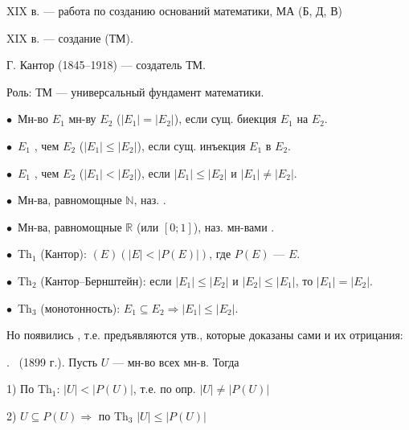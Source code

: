 
\makeatletter
\newcommand{\hov}[1]{\mathord{\begin{tikzpicture}[baseline=(hv.base)]\node[inner sep=0pt,outer sep=0pt](hv){$#1$};
  \pgfmathsetmacro{\hvA}{(rnd-0.5)*1.2}\pgfmathsetmacro{\hvB}{(rnd-0.5)*1.2}%
  \draw[line width=0.6pt,line cap=round] ($(hv.north west)+(-0.5pt,1.6pt+\hvA pt)$) -- ($(hv.north east)+(0.8pt,1.6pt+\hvB pt)$);\end{tikzpicture}}}
\newcommand{\rt}[1]{\surd\!\hov{#1}}
\makeatother
\newcommand{\bul}{\par\hangindent=6mm\hangafter=1\noindent$\bullet$\ }
\newcommand{\nm}[1]{\par\hangindent=7mm\hangafter=1\noindent #1\ }
\shapka
{}
\par
XIX в. --- работа по созданию оснований математики, МА (Б, Д, В)\par
XIX в. --- создание  (ТМ).\par
Г. Кантор (1845--1918) --- создатель ТМ.\par
Роль: ТМ --- универсальный фундамент математики.\par\vspace{1mm}
\bul Мн-во $E_1$  мн-ву $E_2$ ($|E_1|=|E_2|$), если сущ. биекция $E_1$ на $E_2$.
\bul $E_1$ , чем $E_2$ ($|E_1|\le|E_2|$), если сущ. инъекция $E_1$ в $E_2$.
\bul $E_1$ , чем $E_2$ ($|E_1|<|E_2|$), если $|E_1|\le|E_2|$ и $|E_1|\neq|E_2|$.
\bul Мн-ва, равномощные $\mathbb{N}$, наз. .
\bul Мн-ва, равномощные $\mathbb{R}$ (или $[0;1]$), наз. мн-вами .
\bul Th$_1$ (Кантор): $(E)(|E|<|P(E)|)$, где $P(E)$ ---  $E$.
\bul Th$_2$ (Кантор--Бернштейн): если $|E_1|\le|E_2|$ и $|E_2|\le|E_1|$, то $|E_1|=|E_2|$.
\bul Th$_3$ (монотонность): $E_1\subseteq E_2\Rightarrow|E_1|\le|E_2|$.
\par\vspace{1mm}
Но появились , т.е. предъявляются утв., которые доказаны сами и их отрицания:
\nm{1.}  (1899 г.). Пусть $U$ --- мн-во всех мн-в. Тогда\par
\hspace*{6mm}1) По Th$_1$: $|U|<|P(U)|$, т.е. по опр. $|U|\neq|P(U)|$\par
\hspace*{6mm}2) $U\subseteq P(U)\Rightarrow$ по Th$_3$ $|U|\le|P(U)|$\par
